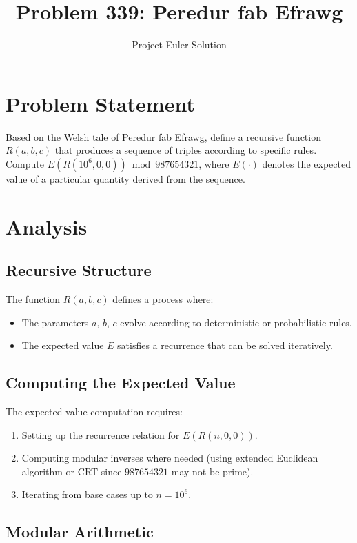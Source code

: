 \documentclass[12pt]{article}
\title{Problem 339: Peredur fab Efrawg}
\author{Project Euler Solution}
\date{}
\begin{document}
\maketitle

\section{Problem Statement}

Based on the Welsh tale of Peredur fab Efrawg, define a recursive function $R(a, b, c)$ that produces a sequence of triples according to specific rules. Compute $E(R(10^6, 0, 0)) \bmod 987654321$, where $E(\cdot)$ denotes the expected value of a particular quantity derived from the sequence.

\section{Analysis}

\subsection{Recursive Structure}

The function $R(a, b, c)$ defines a process where:
\begin{itemize}
    \item The parameters $a$, $b$, $c$ evolve according to deterministic or probabilistic rules.
    \item The expected value $E$ satisfies a recurrence that can be solved iteratively.
\end{itemize}

\subsection{Computing the Expected Value}

The expected value computation requires:
\begin{enumerate}
    \item Setting up the recurrence relation for $E(R(n, 0, 0))$.
    \item Computing modular inverses where needed (using extended Euclidean algorithm or CRT since $987654321$ may not be prime).
    \item Iterating from base cases up to $n = 10^6$.
\end{enumerate}

\subsection{Modular Arithmetic}
\end{document}
